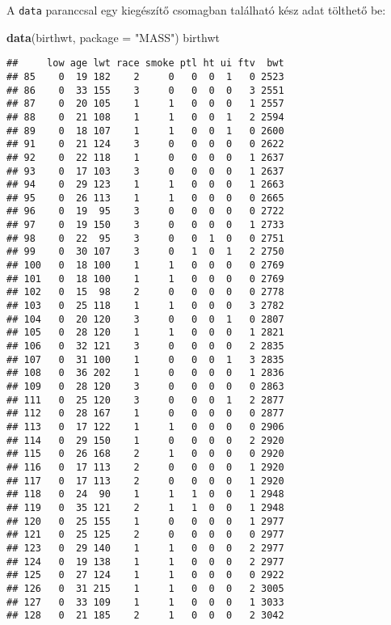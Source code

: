 \documentclass[]{book}
\newenvironment{Shaded}{\begin{snugshade}}{\end{snugshade}}
\newcommand{\DataTypeTok}[1]{\textcolor[rgb]{0.13,0.29,0.53}{#1}}
\newcommand{\KeywordTok}[1]{\textcolor[rgb]{0.13,0.29,0.53}{\textbf{#1}}}
\newcommand{\NormalTok}[1]{#1}
\newcommand{\StringTok}[1]{\textcolor[rgb]{0.31,0.60,0.02}{#1}}
\begin{document}
A \texttt{data} paranccsal egy kiegészítő csomagban található kész adat tölthető be:

\begin{Shaded}
\begin{Highlighting}[]
\KeywordTok{data}\NormalTok{(birthwt, }\DataTypeTok{package =} \StringTok{"MASS"}\NormalTok{)}
\NormalTok{birthwt}
\end{Highlighting}
\end{Shaded}

\begin{verbatim}
##     low age lwt race smoke ptl ht ui ftv  bwt
## 85    0  19 182    2     0   0  0  1   0 2523
## 86    0  33 155    3     0   0  0  0   3 2551
## 87    0  20 105    1     1   0  0  0   1 2557
## 88    0  21 108    1     1   0  0  1   2 2594
## 89    0  18 107    1     1   0  0  1   0 2600
## 91    0  21 124    3     0   0  0  0   0 2622
## 92    0  22 118    1     0   0  0  0   1 2637
## 93    0  17 103    3     0   0  0  0   1 2637
## 94    0  29 123    1     1   0  0  0   1 2663
## 95    0  26 113    1     1   0  0  0   0 2665
## 96    0  19  95    3     0   0  0  0   0 2722
## 97    0  19 150    3     0   0  0  0   1 2733
## 98    0  22  95    3     0   0  1  0   0 2751
## 99    0  30 107    3     0   1  0  1   2 2750
## 100   0  18 100    1     1   0  0  0   0 2769
## 101   0  18 100    1     1   0  0  0   0 2769
## 102   0  15  98    2     0   0  0  0   0 2778
## 103   0  25 118    1     1   0  0  0   3 2782
## 104   0  20 120    3     0   0  0  1   0 2807
## 105   0  28 120    1     1   0  0  0   1 2821
## 106   0  32 121    3     0   0  0  0   2 2835
## 107   0  31 100    1     0   0  0  1   3 2835
## 108   0  36 202    1     0   0  0  0   1 2836
## 109   0  28 120    3     0   0  0  0   0 2863
## 111   0  25 120    3     0   0  0  1   2 2877
## 112   0  28 167    1     0   0  0  0   0 2877
## 113   0  17 122    1     1   0  0  0   0 2906
## 114   0  29 150    1     0   0  0  0   2 2920
## 115   0  26 168    2     1   0  0  0   0 2920
## 116   0  17 113    2     0   0  0  0   1 2920
## 117   0  17 113    2     0   0  0  0   1 2920
## 118   0  24  90    1     1   1  0  0   1 2948
## 119   0  35 121    2     1   1  0  0   1 2948
## 120   0  25 155    1     0   0  0  0   1 2977
## 121   0  25 125    2     0   0  0  0   0 2977
## 123   0  29 140    1     1   0  0  0   2 2977
## 124   0  19 138    1     1   0  0  0   2 2977
## 125   0  27 124    1     1   0  0  0   0 2922
## 126   0  31 215    1     1   0  0  0   2 3005
## 127   0  33 109    1     1   0  0  0   1 3033
## 128   0  21 185    2     1   0  0  0   2 3042

\end{verbatim}
\end{document}
